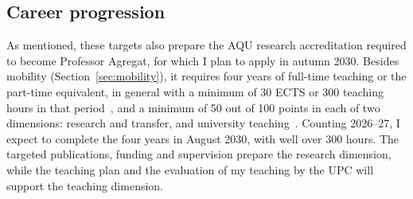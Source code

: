 \documentclass[11pt]{article}
\begin{document}
\subsection{Career progression}
As mentioned, these targets also prepare the AQU research accreditation required to become Professor Agregat, for which I plan to apply in autumn 2030. 
Besides mobility (Section~\ref{sec:mobility}), it requires four years of full-time teaching or the part-time equivalent, in general with a minimum of 30 ECTS or 300 teaching hours in that period~\cite{AQUProc2025}, and a minimum of 50 out of 100 points in each of two dimensions: research and transfer, and university teaching~\cite{AQUCrit2025}. 
Counting 2026--27, I expect to complete the four years in August 2030, with well over 300 hours. 
The targeted publications, funding and supervision prepare the research dimension, while the teaching plan and the evaluation of my teaching by the UPC will support the teaching dimension.
\end{document}
